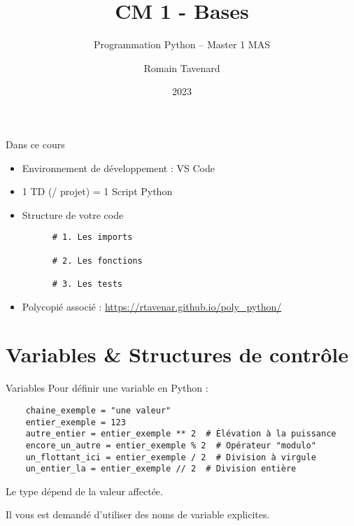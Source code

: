 \documentclass[10pt]{beamer}
\title[M1 MAS -- Python -- Bases]{CM 1 - Bases}
\subtitle{Programmation Python -- Master 1 MAS}
\author{Romain Tavenard}
\date{2023}
\institute{%
\hypersetup{urlcolor=.}
\makebox[2.2ex][c]{\faEnvelope}\enspace\href{mailto:romain.tavenard@univ-rennes2.fr}{\texttt{romain.tavenard@univ-rennes2.fr}}\\%
}
\begin{document}
\maketitle

\begin{frame}[fragile]{Dans ce cours}  
  \begin{itemize}
    \item Environnement de développement : VS Code
    \item 1 TD (/ projet) = 1 Script Python
    \item Structure de votre code
    \begin{beamercodeblock}
      \begin{verbatim}
      # 1. Les imports
  
      # 2. Les fonctions
  
      # 3. Les tests
      \end{verbatim}
    \end{beamercodeblock}
    \item Polycopié associé : \url{https://rtavenar.github.io/poly_python/}
  \end{itemize}

\end{frame}

\section{Variables \& Structures de contrôle}

\begin{frame}[fragile]{Variables}  
  Pour définir une variable en Python :
  \begin{beamercodeblock}
    \begin{verbatim}
    chaine_exemple = "une valeur"
    entier_exemple = 123
    autre_entier = entier_exemple ** 2  # Élévation à la puissance
    encore_un_autre = entier_exemple % 2  # Opérateur "modulo"
    un_flottant_ici = entier_exemple / 2  # Division à virgule
    un_entier_la = entier_exemple // 2  # Division entière
    \end{verbatim}
  \end{beamercodeblock}
  Le type dépend de la valeur affectée.

  Il vous est demandé d'utiliser des \alert{noms de variable explicites}.
\end{frame}
\end{document}
